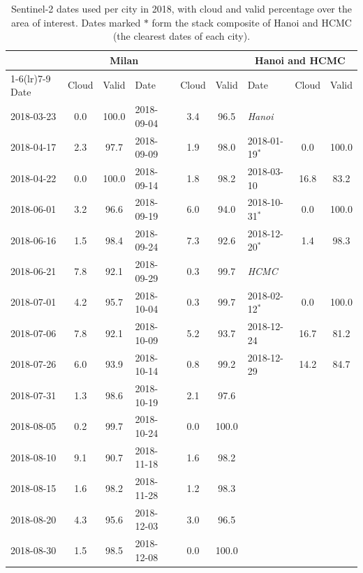 \begin{table}[htbp]
  \centering
  \small
  \setlength{\tabcolsep}{5pt}
  \caption{Sentinel-2 dates used per city in 2018, with cloud and valid
  percentage over the area of interest. Dates marked $\ast$ form the stack
  composite of Hanoi and HCMC (the clearest dates of each city).
  }
  \label{tab:dates}
  \begin{tabular}{lcc@{\hspace{14pt}}lcc@{\hspace{14pt}}lcc}
    \toprule
    \multicolumn{6}{c}{Milan} & \multicolumn{3}{c}{Hanoi and HCMC} \\
    \cmidrule(lr){1-6}\cmidrule(lr){7-9}
    Date & Cloud & Valid & Date & Cloud & Valid & Date & Cloud & Valid \\
    \midrule
    2018-03-23 & 0.0 & 100.0 & 2018-09-04 & 3.4 & 96.5 & \multicolumn{3}{l}{\emph{Hanoi}} \\
    2018-04-17 & 2.3 & 97.7 & 2018-09-09 & 1.9 & 98.0 & 2018-01-19$^\ast$ & 0.0 & 100.0 \\
    2018-04-22 & 0.0 & 100.0 & 2018-09-14 & 1.8 & 98.2 & 2018-03-10 & 16.8 & 83.2 \\
    2018-06-01 & 3.2 & 96.6 & 2018-09-19 & 6.0 & 94.0 & 2018-10-31$^\ast$ & 0.0 & 100.0 \\
    2018-06-16 & 1.5 & 98.4 & 2018-09-24 & 7.3 & 92.6 & 2018-12-20$^\ast$ & 1.4 & 98.3 \\
    2018-06-21 & 7.8 & 92.1 & 2018-09-29 & 0.3 & 99.7 & \multicolumn{3}{l}{\emph{HCMC}} \\
    2018-07-01 & 4.2 & 95.7 & 2018-10-04 & 0.3 & 99.7 & 2018-02-12$^\ast$ & 0.0 & 100.0 \\
    2018-07-06 & 7.8 & 92.1 & 2018-10-09 & 5.2 & 93.7 & 2018-12-24 & 16.7 & 81.2 \\
    2018-07-26 & 6.0 & 93.9 & 2018-10-14 & 0.8 & 99.2 & 2018-12-29 & 14.2 & 84.7 \\
    2018-07-31 & 1.3 & 98.6 & 2018-10-19 & 2.1 & 97.6 & & & \\
    2018-08-05 & 0.2 & 99.7 & 2018-10-24 & 0.0 & 100.0 & & & \\
    2018-08-10 & 9.1 & 90.7 & 2018-11-18 & 1.6 & 98.2 & & & \\
    2018-08-15 & 1.6 & 98.2 & 2018-11-28 & 1.2 & 98.3 & & & \\
    2018-08-20 & 4.3 & 95.6 & 2018-12-03 & 3.0 & 96.5 & & & \\
    2018-08-30 & 1.5 & 98.5 & 2018-12-08 & 0.0 & 100.0 & & & \\
    \bottomrule
  \end{tabular}
\end{table}

